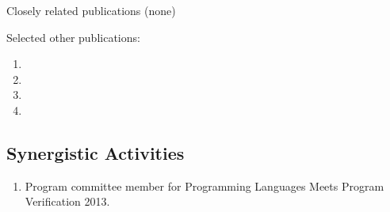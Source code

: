 
\noindent Closely related publications (none)


\noindent
\noindent Selected other publications:
\begin{enumerate}\itemsep 0pt
\item {}
\item {}
\item {}
\item {}
\end{enumerate} 

\subsection*{Synergistic Activities}


\begin{enumerate}\itemsep 0pt
  \item Program committee member for Programming Languages Meets Program Verification 2013.
\end{enumerate}


